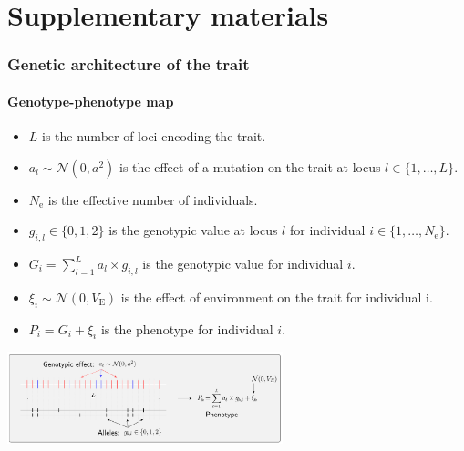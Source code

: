 \documentclass{article}
\newcommand{\Ne}{N_{\text{e}}}
\newcommand{\Trait}{P}
\newcommand{\NbrLoci}{L}
\newcommand{\VarEnv}{V_{\mathrm{E}}}
\renewcommand{\baselinestretch}{1.5}
\begin{document}
\printbibliography

\newpage

\part*{Supplementary materials}
\renewcommand{\thetable}{S\arabic{table}}
\renewcommand{\thefigure}{S\arabic{figure}}
\setcounter{figure}{0}
\setcounter{table}{0}
\setcounter{section}{0}

\renewcommand{\baselinestretch}{1.0}\normalsize
\tableofcontents
\renewcommand{\baselinestretch}{1.5}\normalsize

\newpage
\section{Genetic architecture of the trait}\label{sec:simulator}

\subsection{Genotype-phenotype map}\label{subsec:genotype-phenotype-map}

\begin{itemize}
    \item $\NbrLoci$ is the number of loci encoding the trait.
    \item $a_l \sim \mathcal{N}(0,a^2)$ is the effect of a mutation on the trait at locus $l \in \{1, \hdots, \NbrLoci\}$.
    \item $\Ne$ is the effective number of individuals.
    \item $g_{i,l} \in \{0, 1, 2\}$ is the genotypic value at locus $l$ for individual $i \in \{1, \hdots, \Ne\}$.
    \item $G_i = \sum_{l=1}^{\NbrLoci} a_l \times g_{i,l}$ is the genotypic value for individual $i$.
    \item $\xi_i \sim \mathcal{N}(0, \VarEnv)$ is the effect of environment on the trait for individual i.
    \item $\Trait_i = G_i + \xi_i$ is the phenotype for individual $i$.
\end{itemize}

\begin{center}
    \includegraphics[width=0.6\textwidth, page=1] {figureS1}
    \label{fig:simulator-summary}
\end{center}
\end{document}
